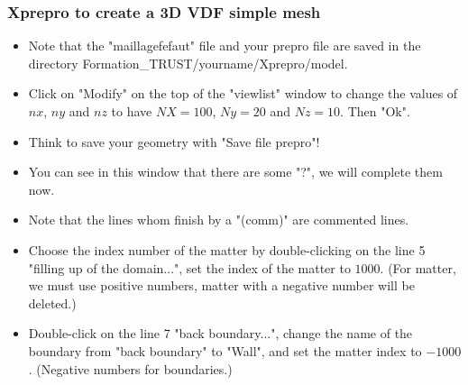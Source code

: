 \documentclass[10pt, hyperref={unicode=true,pdfusetitle, bookmarks=true,bookmarksnumbered=false,bookmarksopen=false, breaklinks=false,pdfborder={0 0 1},backref=true,colorlinks=true,linkcolor=darkblue,pageanchor}]{beamer}
\begin{document}
\begin{frame}
\frametitle{Xprepro to create a 3D VDF simple mesh}
\begin{block}{}

\begin{itemize}
\item Note that the "maillagefefaut" file and your prepro file are saved in the directory Formation\_TRUST/yourname/Xprepro/model.
\item Click on "Modify" on the top of the "viewlist" window to change the values of $nx$, $ny$ and $nz$ to have $NX=100$, $Ny=20$ and $Nz=10$. Then "Ok". 
\item Think to save your geometry with "Save file prepro"!
\item You can see in this window that there are some "?", we will complete them now.
\item Note that the lines whom finish by a "(comm)" are commented lines.
\item Choose the index number of the matter by double-clicking on the line 5 "filling up of the domain...", set the index of the matter to $1000$. (For matter, we must use positive numbers, matter with a negative number will be deleted.)
\item Double-click on the line 7 "back boundary...", change the name of the boundary from "back boundary" to "Wall", and set the matter index to $-1000$. (Negative numbers for boundaries.)
\end{itemize}

\end{block}
\end{frame}
\end{document}
